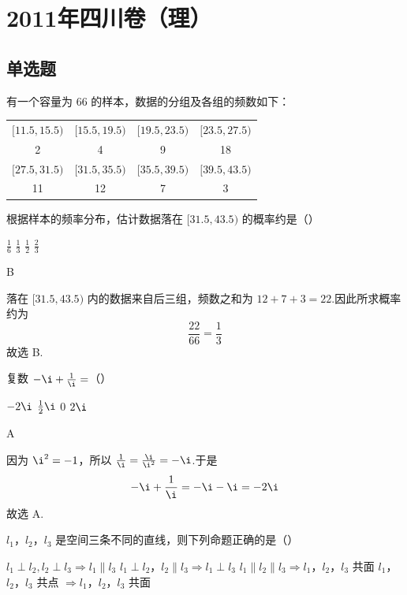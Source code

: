 \chapter{2011年四川卷（理）}

\section{单选题}

\begin{problem}
有一个容量为 66 的样本，数据的分组及各组的频数如下：
\begin{center}
\begin{tabular}{cccc}
\([11.5,15.5)\) & \([15.5,19.5)\) & \([19.5,23.5)\) & \([23.5,27.5)\)\\
2 & 4 & 9 & 18\\
\([27.5,31.5)\) & \([31.5,35.5)\) & \([35.5,39.5)\) & \([39.5,43.5)\)\\
11 & 12 & 7 & 3
\end{tabular}
\end{center}
根据样本的频率分布，估计数据落在 \([31.5,43.5)\) 的概率约是（\quad）

\choices
    {\(\frac{1}{6}\)}
    {\(\frac{1}{3}\)}
    {\(\frac{1}{2}\)}
    {\(\frac{2}{3}\)}
\end{problem}

\begin{answer}
B
\end{answer}

\begin{solution}
落在 \([31.5,43.5)\) 内的数据来自后三组，频数之和为 \(12+7+3=22\).因此所求概率约为
\[
\frac{22}{66}=\frac{1}{3}
\]
故选 B.
\end{solution}

\begin{problem}
复数 \(-\i + \frac{1}{\i} =\)（\quad）

\choices
    {\(-2\i\)}
    {\(\frac{1}{2}\i\)}
    {\(0\)}
    {\(2\i\)}
\end{problem}

\begin{answer}
A
\end{answer}

\begin{solution}
因为 \(\i^2=-1\)，所以 \(\frac{1}{\i}=\frac{\i}{\i^2}=-\i\).于是
\[
-\i+\frac{1}{\i}=-\i-\i=-2\i
\]
故选 A.
\end{solution}

\begin{problem}
\(l_{1}\)，\(l_{2}\)，\(l_{3}\) 是空间三条不同的直线，则下列命题正确的是（\quad）

\choices
    {\(l_{1} \perp l_{2}, l_{2} \perp l_{3} \Rightarrow l_{1} \parallel l_{3}\)}
    {\(l_{1} \perp l_{2}\)，\(l_{2} \parallel l_{3} \Rightarrow l_{1} \perp l_{3}\)}
    {\(l_{1} \parallel l_{2} \parallel l_{3} \Rightarrow l_{1}\)，\(l_{2}\)，\(l_{3}\) 共面}
    {\(l_{1}\)，\(l_{2}\)，\(l_{3}\) 共点 \(\Rightarrow l_{1}\)，\(l_{2}\)，\(l_{3}\) 共面}
\end{problem}

